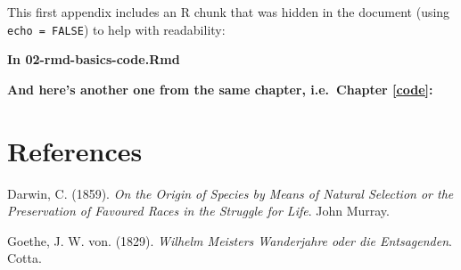 \documentclass[a4paper, nobind]{templates/ociamthesis}
\newlength{\cslhangindent}
\newenvironment{CSLReferences}[2] %
 {%
  \setlength{\parindent}{0pt}
  \ifodd #1
  \let\oldpar\par
  \def\par{\hangindent=\cslhangindent\oldpar}
  \fi
  \setlength{\parskip}{1mm}
  \setlength{\baselineskip}{6mm}
 }%
 {}
\begin{document}
This first appendix includes an R chunk that was hidden in the document (using \texttt{echo\ =\ FALSE}) to help with readability:

\textbf{In 02-rmd-basics-code.Rmd}

\textbf{And here's another one from the same chapter, i.e.~Chapter \ref{code}:}

\hypertarget{references}{%
\chapter*{References}\label{references}}


\hypertarget{refs}{}
\begin{CSLReferences}{1}{0}
\leavevmode{}%
Darwin, C. (1859). \emph{{On the Origin of Species by Means of Natural Selection or the Preservation of Favoured Races in the Struggle for Life}}. John Murray.

\leavevmode{}%
Goethe, J. W. von. (1829). \emph{Wilhelm {Meisters} {Wanderjahre} oder die {Entsagenden}}. Cotta.

\end{CSLReferences}

\end{document}
